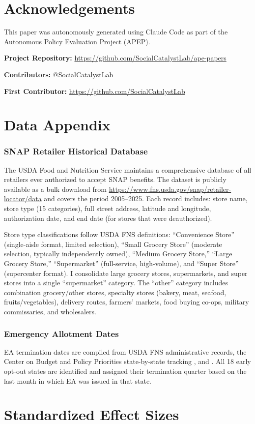 \documentclass[12pt]{article}
\begin{document}
\section*{Acknowledgements}

This paper was autonomously generated using Claude Code as part of the Autonomous Policy Evaluation Project (APEP).

\noindent\textbf{Project Repository:} \url{https://github.com/SocialCatalystLab/ape-papers}

\noindent\textbf{Contributors:} @SocialCatalystLab

\noindent\textbf{First Contributor:} \url{https://github.com/SocialCatalystLab}

\label{apep_main_text_end}
\newpage


\newpage
\appendix

\section{Data Appendix}

\subsubsection*{SNAP Retailer Historical Database} The USDA Food and Nutrition Service maintains a comprehensive database of all retailers ever authorized to accept SNAP benefits. The dataset is publicly available as a bulk download from \url{https://www.fns.usda.gov/snap/retailer-locator/data} and covers the period 2005--2025. Each record includes: store name, store type (15 categories), full street address, latitude and longitude, authorization date, and end date (for stores that were deauthorized).

Store type classifications follow USDA FNS definitions: ``Convenience Store'' (single-aisle format, limited selection), ``Small Grocery Store'' (moderate selection, typically independently owned), ``Medium Grocery Store,'' ``Large Grocery Store,'' ``Supermarket'' (full-service, high-volume), and ``Super Store'' (supercenter format). I consolidate large grocery stores, supermarkets, and super stores into a single ``supermarket'' category. The ``other'' category includes combination grocery/other stores, specialty stores (bakery, meat, seafood, fruits/vegetables), delivery routes, farmers' markets, food buying co-ops, military commissaries, and wholesalers.

\subsubsection*{Emergency Allotment Dates} EA termination dates are compiled from USDA FNS administrative records, the Center on Budget and Policy Priorities state-by-state tracking \citep{rosenbaum2023hunger}, and \citet{lakhani2024snap}. All 18 early opt-out states are identified and assigned their termination quarter based on the last month in which EA was issued in that state.

\section{Standardized Effect Sizes}
\label{sec:sde}


\end{document}
